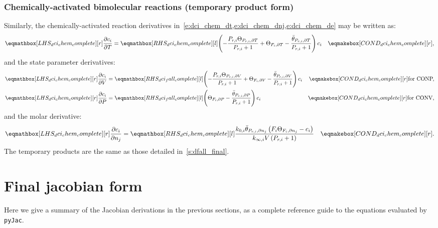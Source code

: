 \documentclass[12pt,number,sort&compress]{elsarticle}
\begin{document}
\subsubsection{Chemically-activated bimolecular reactions (temporary product form)}
Similarly, the chemically-activated reaction derivatives in~\cref{e:dci_chem_dt,e:dci_chem_dnj,e:dci_chem_de} may be written as:
\begin{align}
\label{e:dci_chem_dt_final}
\lhs{dci_chem_complete}{\frac{\partial c_{i}}{\partial T }} &= \rhs{dci_chem_complete}{\left(- \frac{P_{r, i} \Theta_{P_{r,i}, \partial T}}{P_{r, i} + 1} + \Theta_{F_i, \partial T} - \frac{\bar{\theta}_{P_{r, i}, \partial T}}{P_{r, i} + 1}\right) c_{i}} & \cond{dci_chem_complete}{,}
\end{align}
and the state parameter derivatives:
\begin{subequations}
 \label{e:dci_chem_de_final}
 \begin{align}
  \lhs{dci_chem_complete}{\frac{\partial c_{i}}{\partial V }} &= \rhs{dci_fall_complete}{\left(- \frac{P_{r, i} \Theta_{P_{r,i}, \partial V}}{P_{r, i} + 1} + \Theta_{F_i, \partial V} - \frac{\bar{\theta}_{P_{r, i}, \partial V}}{P_{r, i} + 1}\right) c_{i}} & \cond{dci_chem_complete}{\dconp/} \\
  \lhs{dci_chem_complete}{\frac{\partial c_{i}}{\partial P }} &= \rhs{dci_fall_complete}{\left(\Theta_{F_i, \partial P} - \frac{\bar{\theta}_{P_{r, i}, \partial P}}{P_{r, i} + 1}\right) c_{i}} & \cond{dci_chem_complete}{\dconv/}
 \end{align}
\end{subequations}
and the molar derivative:
\begin{align}
\label{e:dci_chem_dnj_final}
\lhs{dci_chem_complete}{\frac{\partial c_{i} }{\partial {n_j} }} &= \rhs{dci_chem_complete}{\frac{k_{0, i} \bar{\theta}_{P_{r, i}, \partial n_j} \left(F_{i} \Theta_{F_i, \partial n_j} - c_{i}\right)}{k_{\infty, i} V \left(P_{r, i} + 1\right)}} & \cond{dci_chem_complete}{.}
\end{align}
The temporary products are the same as those detailed in~\cref{s:dfall_final}.


\section{Final jacobian form}
\label{s:jac_final}

Here we give a summary of the Jacobian derivations in the previous sections, as a complete reference guide to the equations evaluated by \texttt{pyJac}.
\end{document}
